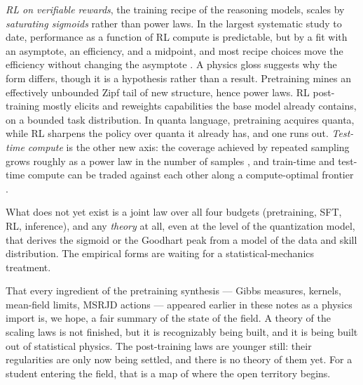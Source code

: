 \documentclass[11pt]{article}
\begin{document}
\emph{RL on verifiable rewards}, the training recipe of the reasoning models, scales by \emph{saturating sigmoids} rather than power laws. In the largest systematic study to date, performance as a function of RL compute is predictable, but by a fit with an asymptote, an efficiency, and a midpoint, and most recipe choices move the efficiency without changing the asymptote \cite{khatri2025art}. A physics gloss suggests why the form differs, though it is a hypothesis rather than a result. Pretraining mines an effectively unbounded Zipf tail of new structure, hence power laws. RL post-training mostly elicits and reweights capabilities the base model already contains, on a bounded task distribution. In quanta language, pretraining acquires quanta, while RL sharpens the policy over quanta it already has, and one runs out. \emph{Test-time compute} is the other new axis: the coverage achieved by repeated sampling grows roughly as a power law in the number of samples \cite{brown2024monkeys}, and train-time and test-time compute can be traded against each other along a compute-optimal frontier \cite{snell2024test}.

What does not yet exist is a joint law over all four budgets (pretraining, SFT, RL, inference), and any \emph{theory} at all, even at the level of the quantization model, that derives the sigmoid or the Goodhart peak from a model of the data and skill distribution. The empirical forms are waiting for a statistical-mechanics treatment.

That every ingredient of the pretraining synthesis --- Gibbs measures, kernels, mean-field limits, MSRJD actions --- appeared earlier in these notes as a physics import is, we hope, a fair summary of the state of the field. A theory of the scaling laws is not finished, but it is recognizably being built, and it is being built out of statistical physics. The post-training laws are younger still: their regularities are only now being settled, and there is no theory of them yet. For a student entering the field, that is a map of where the open territory begins.





\appendix
\end{document}
